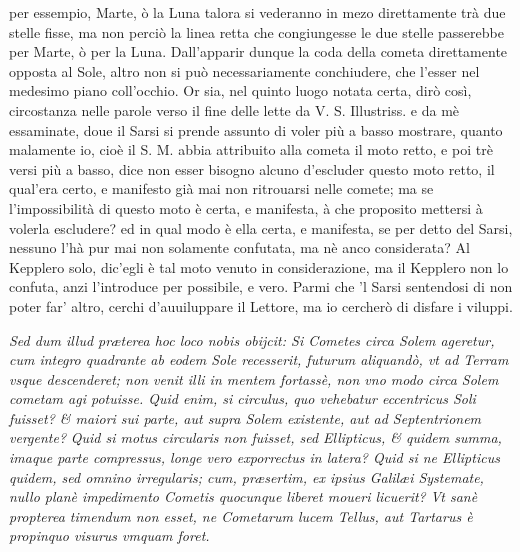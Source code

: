 \documentclass[11pt,twoside,openany]{book}
\begin{document}
per essempio, Marte, ò la Luna talora si vederanno in mezo direttamente trà due stelle fisse, ma non perciò la linea retta che congiungesse le due stelle passerebbe per Marte, ò per la Luna. Dall'apparir dunque la coda della cometa direttamente opposta al Sole, altro non si può necessariamente conchiudere, che l'esser nel medesimo piano coll'occhio. Or sia, nel quinto luogo notata certa, dirò così, circostanza nelle parole verso il fine delle lette da V. S. Illustriss. e da mè essaminate, doue il Sarsi si prende assunto di voler più a basso mostrare, quanto malamente io, cioè il S. M. abbia attribuito alla cometa il moto retto, e poi trè versi più a basso, dice non esser bisogno alcuno d'escluder questo moto retto, il qual'era certo, e manifesto già mai non ritrouarsi nelle comete; ma se l'impossibilità di questo moto è certa, e manifesta, à che proposito mettersi à volerla escludere? ed in qual modo è ella certa, e manifesta, se per detto del Sarsi, nessuno l'hà pur mai non solamente confutata, ma nè anco considerata? Al Kepplero solo, dic'egli è tal moto venuto in considerazione, ma il Kepplero non lo confuta, anzi l'introduce per possibile, e vero. Parmi che 'l Sarsi sentendosi di non poter far' altro, cerchi d'auuiluppare il Lettore, ma io cercherò di disfare i viluppi.



\par\bigskip\noindent{}\enspace \textit{Sed dum illud præterea hoc loco nobis obijcit: Si Cometes circa Solem ageretur, cum integro quadrante ab eodem Sole recesserit, futurum aliquandò, vt ad Terram vsque descenderet; non venit illi in mentem fortassè, non vno modo circa Solem cometam agi potuisse. Quid enim, si circulus, quo vehebatur eccentricus Soli fuisset? \& maiori sui parte, aut supra Solem existente, aut ad Septentrionem vergente? }\textit{Quid si motus circularis non fuisset, sed Ellipticus, \& quidem summa, imaque parte compressus, longe vero exporrectus in latera? Quid si ne Ellipticus quidem, sed omnino irregularis; cum, præsertim, ex ipsius Galilæi Systemate, nullo planè impedimento Cometis quocunque liberet moueri licuerit? }\textit{Vt sanè propterea timendum non esset, ne Cometarum lucem Tellus, aut Tartarus è propinquo visurus vmquam foret.}
\end{document}
